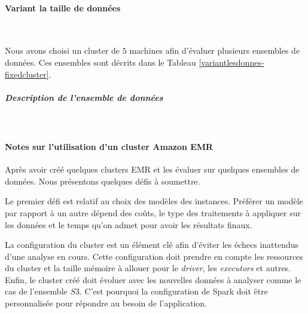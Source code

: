 
\paragraph{Variant la taille de données}~

Nous avons choisi un cluster de $ 5 $ machines afin d'évaluer plusieurs ensembles de données. Ces ensembles sont décrits dans le Tableau \ref{variantlesdonnes-fixedcluster}.
\subparagraph{Description de l'ensemble de données}~

\begin{table}[H]
	\centering
\caption{text}
\label{variantlesdonnes-fixedcluster}
\end{table}


\paragraph{Notes sur l'utilisation d'un cluster Amazon EMR}

Après avoir créé quelques clusters EMR et les évaluer sur quelques ensembles de données. Nous présentons quelques défis à soumettre. 

Le premier défi est relatif au  choix des modèles des instances. Préférer un modèle par rapport à un autre dépend des coûts, le type des traitements à appliquer sur les données et le temps qu'on admet pour avoir les résultats finaux.

La configuration du cluster est un élément clé afin d'éviter les échecs inattendus d'une analyse en cours. Cette configuration doit prendre en compte les ressources du cluster  et  la taille mémoire à allouer pour le \textit{driver}, les \textit{executors} et autres.
Enfin, le cluster créé doit évoluer avec les nouvelles données à analyser comme le cas de l'ensemble $ S3 $. C'est pourquoi la configuration de Spark doit être personnalisée pour répondre au besoin de l'application.


